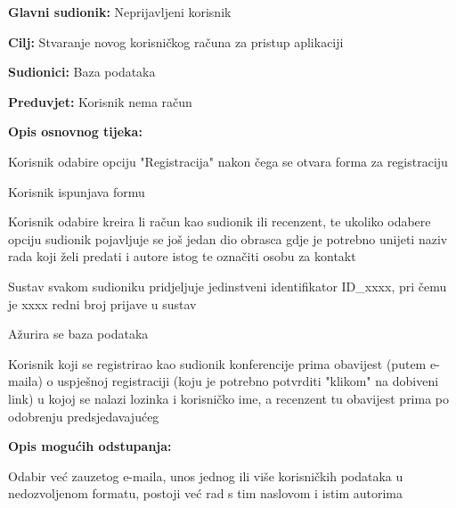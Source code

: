 					\noindent {}
					\begin{packed_item}
	
						\item \textbf{Glavni sudionik: } Neprijavljeni korisnik
						\item  \textbf{Cilj:} Stvaranje novog korisničkog računa za pristup aplikaciji
						\item  \textbf{Sudionici:} Baza podataka
						\item  \textbf{Preduvjet:} Korisnik nema račun
						\item  \textbf{Opis osnovnog tijeka:}
						
						\item[] \begin{packed_enum}
	
							\item Korisnik odabire opciju "Registracija" nakon čega se otvara forma za registraciju
							\item Korisnik ispunjava formu
							\item Korisnik odabire kreira li račun kao sudionik ili recenzent, te ukoliko odabere opciju sudionik pojavljuje se još jedan dio obrasca gdje je potrebno unijeti naziv rada koji želi predati i autore istog te označiti osobu za kontakt
							\item Sustav svakom sudioniku pridjeljuje jedinstveni identifikator ID\_xxxx, pri čemu je xxxx redni broj prijave u sustav
							\item Ažurira se baza podataka
							\item Korisnik koji se registrirao kao sudionik konferencije prima obavijest (putem e-maila) o uspješnoj registraciji (koju je potrebno potvrditi "klikom" na dobiveni link) u kojoj se nalazi lozinka i korisničko ime, a recenzent tu obavijest prima po odobrenju predsjedavajućeg
							
						\end{packed_enum}

						\item  \textbf{Opis mogućih odstupanja:}
						
						\item[] \begin{packed_item}
	
							\item[2.a]  Odabir već zauzetog e-maila, unos jednog ili više korisničkih podataka u nedozvoljenom formatu, postoji već rad s tim naslovom i istim autorima
							\item[] \begin{packed_enum}
								

\end{packed_enum}
\end{packed_item}
\end{packed_item}
